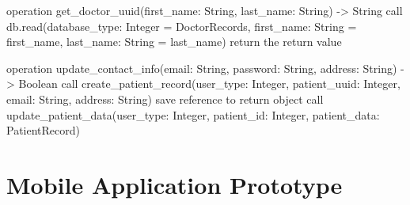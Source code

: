 \documentclass[a4paper, 11pt]{article}
\begin{document}
\begin{appendices}
\begin{pseudocode}[caption={ClientView Derived Entity Class}, label={client}]
{  operation get_doctor_uuid(first_name: String, last_name: String) -> String {
    call db.read(database_type: Integer = DoctorRecords, first_name: String = first_name, last_name: String = last_name)
    return the return value
  }

  operation update_contact_info(email: String, password: String, address: String) -> Boolean {
    call create_patient_record(user_type: Integer, patient_uuid: Integer, email: String, address: String)
    save reference to return object
    call update_patient_data(user_type: Integer, patient_id: Integer, patient_data: PatientRecord)
  }

}
\end{pseudocode}

\newpage
\section{Mobile Application Prototype}

\label{appendix:prototype}


\end{appendices}
\end{document}
